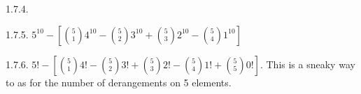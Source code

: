 \begin {itemize}
\begin{ans}{1.7.4.}
	
\end{ans}
\begin{ans}{1.7.5.}
	$5^{10} - \left[{5 \choose 1}4^{10} - {5 \choose 2}3^{10} + {5 \choose 3}2^{10} - {5 \choose 4}1^{10}\right]$ %
	
\end{ans}
\begin{ans}{1.7.6.}
	$5! - \left[{5 \choose 1}4! - {5 \choose 2}3! + {5 \choose 3}2! - {5 \choose 4}1! + {5 \choose 5}0!\right]$.  This is a sneaky way to as for the number of derangements on 5 elements. %
	
\end{ans}
\protect \end {itemize}
